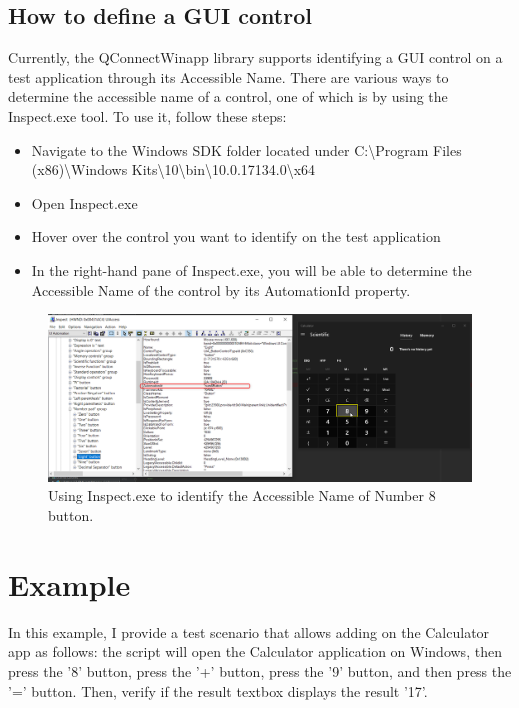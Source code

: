 \hypertarget{definition}{%
\subsection{\texorpdfstring{\textbf{How to define a GUI control}}{definition}}\label{definition}}
Currently, the QConnectWinapp library supports identifying a GUI control on a test application through its Accessible Name. There are various ways to determine the accessible name of a control, one of which is by using the Inspect.exe tool. To use it, follow these steps:
\begin{itemize}
\item Navigate to the Windows SDK folder located under C:\textbackslash Program Files (x86)\textbackslash Windows Kits\textbackslash 10\textbackslash bin\textbackslash 10.0.17134.0\textbackslash x64
\item Open Inspect.exe
\item Hover over the control you want to identify on the test application
\item In the right-hand pane of Inspect.exe, you will be able to determine the Accessible Name of the control by its AutomationId property.
\end{itemize}

\begin{figure}[h]
  \centering
  \includegraphics[width=\linewidth]{pictures/capture_control.png}
  \caption{Using Inspect.exe to identify the Accessible Name of Number 8 button.}
\end{figure}

\hypertarget{example}{%
\section{Example}\label{example}}
In this example, I provide a test scenario that allows adding on the Calculator app as follows: the script will open the Calculator application on Windows, then press the '8' button, press the '+' button, press the '9' button, and then press the '=' button. 
Then, verify if the result textbox displays the result '17'.


